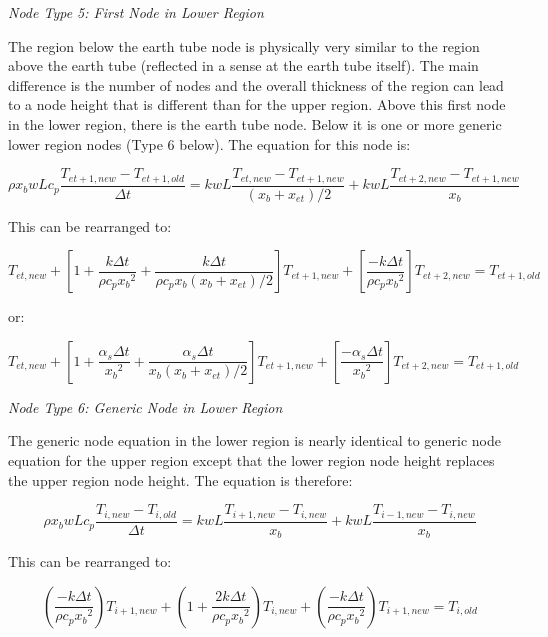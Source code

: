 \emph{\textit{Node Type 5: First Node in Lower Region}}

The region below the earth tube node is physically very similar to the region above the earth tube (reflected in a sense at the earth tube itself).  The main difference is the number of nodes and the overall thickness of the region can lead to a node height that is different than for the upper region.  Above this first node in the lower region, there is the earth tube node.  Below it is one or more generic lower region nodes (Type 6 below).  The equation for this node is:

\begin{equation}
\rho x_b w L c_p \frac{T_{et+1,new} - T_{et+1,old}}{\Delta t} = k w L \frac{T_{et,new}-T_{et+1,new}}{(x_b + x_{et})/2} + k w L \frac{T_{et+2,new}-T_{et+1,new}}{x_b}
\end{equation}

This can be rearranged to:

\begin{equation}
[\frac{-k \Delta t}{\rho c_p x_b (x_b + x_{et})/2}] T_{et,new} + [1 + \frac{k \Delta t}{\rho c_p {x_b}^2} + \frac{k \Delta t}{\rho c_p x_b (x_b+x_{et})/2}] T_{et+1,new} + [\frac{-k \Delta t}{\rho c_p {x_b}^2}] T_{et+2,new} = T_{et+1,old}
\end{equation}

or:

\begin{equation}
[\frac{-\alpha_s \Delta t}{x_b (x_b + x_{et})/2}] T_{et,new} + [1 + \frac{\alpha_s \Delta t}{{x_b}^2} + \frac{\alpha_s \Delta t}{x_b (x_b+x_{et})/2}] T_{et+1,new} + [\frac{-\alpha_s \Delta t}{{x_b}^2}] T_{et+2,new} = T_{et+1,old}
\end{equation}

\emph{\textit{Node Type 6: Generic Node in Lower Region}}

The generic node equation in the lower region is nearly identical to generic node equation for the upper region except that the lower region node height replaces the upper region node height.  The equation is therefore:

\begin{equation}
\rho x_b w L c_p \frac{T_{i,new} - T_{i,old}}{\Delta t} = k w L \frac{T_{i+1,new}-T_{i,new}}{x_b} + k w L \frac{T_{i-1,new}-T_{i,new}}{x_b}
\end{equation}

This can be rearranged to:

\begin{equation}
(\frac{-k \Delta t}{\rho c_p {x_b}^2}) T_{i+1,new} + (1 + \frac{2 k \Delta t}{\rho c_p {x_b}^2}) T_{i,new} + (\frac{-k \Delta t}{\rho c_p {x_b}^2}) T_{i+1,new} = T_{i,old}
\end{equation}

